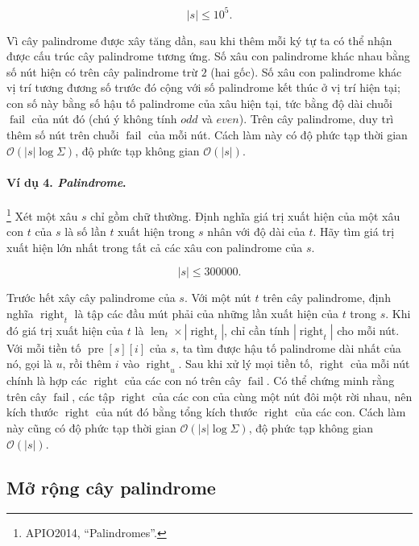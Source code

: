 \documentclass[11pt]{article}
\newcommand{\Oh}{\mathcal{O}}
\begin{document}
\[
|s|\le 10^5.
\]

Vì cây palindrome được xây tăng dần, sau khi thêm mỗi ký tự ta có thể nhận
được cấu trúc cây palindrome tương ứng. Số xâu con palindrome khác nhau bằng
số nút hiện có trên cây palindrome trừ \(2\) (hai gốc). Số xâu con palindrome
khác vị trí tương đương số trước đó cộng với số palindrome kết thúc ở vị trí
hiện tại; con số này bằng số hậu tố palindrome của xâu hiện tại, tức bằng độ
dài chuỗi \(\operatorname{fail}\) của nút đó (chú ý không tính
\(\textit{odd}\) và \(\textit{even}\)). Trên cây palindrome, duy trì thêm số
nút trên chuỗi \(\operatorname{fail}\) của mỗi nút. Cách làm này có độ phức
tạp thời gian \(\Oh(|s|\log \Sigma)\), độ phức tạp không gian \(\Oh(|s|)\).

\paragraph{Ví dụ 4. \emph{Palindrome}.}
\footnote{APIO2014, ``Palindromes''.}
Xét một xâu \(s\) chỉ gồm chữ thường. Định nghĩa giá trị xuất hiện của một xâu
con \(t\) của \(s\) là số lần \(t\) xuất hiện trong \(s\) nhân với độ dài của
\(t\). Hãy tìm giá trị xuất hiện lớn nhất trong tất cả các xâu con palindrome
của \(s\).

\[
|s|\le 300000.
\]

Trước hết xây cây palindrome của \(s\). Với một nút \(t\) trên cây palindrome,
định nghĩa \(\operatorname{right}_t\) là tập các đầu mút phải của những lần
xuất hiện của \(t\) trong \(s\). Khi đó giá trị xuất hiện của \(t\) là
\(\operatorname{len}_t\times |\operatorname{right}_t|\), chỉ cần tính
\(|\operatorname{right}_t|\) cho mỗi nút. Với mỗi tiền tố
\(\operatorname{pre}[s][i]\) của \(s\), ta tìm được hậu tố palindrome dài nhất
của nó, gọi là \(u\), rồi thêm \(i\) vào \(\operatorname{right}_u\). Sau khi
xử lý mọi tiền tố, \(\operatorname{right}\) của mỗi nút chính là hợp các
\(\operatorname{right}\) của các con nó trên cây \(\operatorname{fail}\). Có
thể chứng minh rằng trên cây \(\operatorname{fail}\), các tập
\(\operatorname{right}\) của các con của cùng một nút đôi một rời nhau, nên
kích thước \(\operatorname{right}\) của nút đó bằng tổng kích thước
\(\operatorname{right}\) của các con. Cách làm này cũng có độ phức tạp thời
gian \(\Oh(|s|\log \Sigma)\), độ phức tạp không gian \(\Oh(|s|)\).

\subsection{Mở rộng cây palindrome}
\end{document}
